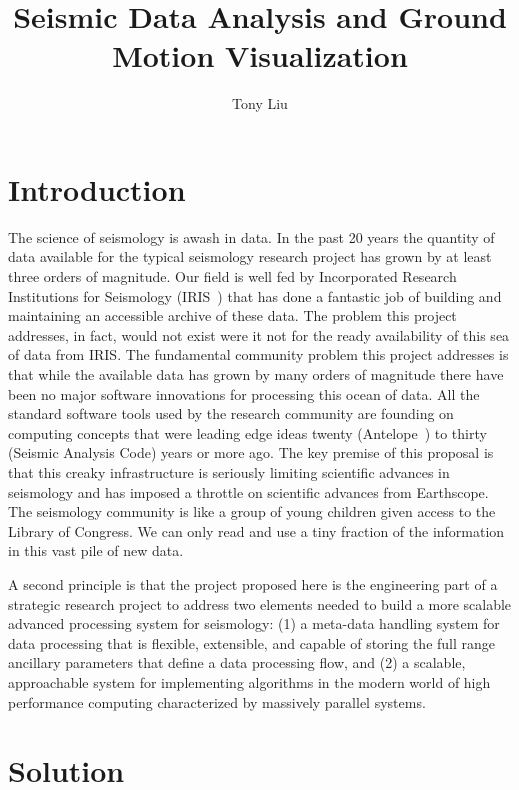 \documentclass[9pt,twocolumn,twoside]{../../styles/osajnl}
\title{Seismic Data Analysis and Ground Motion Visualization}
\author[1]{Tony Liu}
\affil[1]{School of Informatics and Computing, Bloomington, IN 47408, U.S.A.}
\affil[*]{Corresponding authors: xl41@iu.edu}
\begin{document}
\maketitle

\section{Introduction}

The science of seismology is awash in data. In the past 20 years the quantity of data available for the typical seismology research project has grown by at least three orders of magnitude.  Our field is well fed by Incorporated Research Institutions for Seismology (IRIS~\cite{www-iris}) that has done a fantastic job of building and maintaining an accessible archive of these data.  The problem this project addresses, in fact, would not exist were it not for the ready availability of this sea of data from IRIS.  The fundamental community problem this project addresses is that while the available data has grown by many orders of magnitude there have been no major software innovations for processing this ocean of data.  All the standard software tools used by the research community are founding on computing concepts that were leading edge ideas twenty (Antelope~\cite{www-antelope}) to thirty (Seismic Analysis Code) years or more ago.  The key premise of this proposal is that this creaky infrastructure is seriously limiting scientific advances in seismology and has imposed a throttle on scientific advances from Earthscope.  The seismology community is like a group of young children given access to the Library of Congress.  We can only read and use a tiny fraction of the information in this vast pile of new data.

A second principle is that the project proposed here is the engineering part of a strategic research project to address two elements needed to build a more scalable advanced processing system for seismology: (1) a meta-data handling system for data processing that is flexible, extensible, and capable of storing the full range ancillary parameters that define a data processing flow, and (2) a scalable, approachable system for implementing algorithms in the modern world of high performance computing characterized by massively parallel systems.


\section{Solution}
\end{document}
